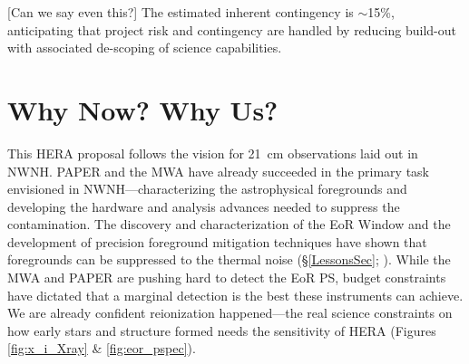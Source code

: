 \documentclass[preprint]{aastex}
\begin{document}
%

[Can we say even this?] The estimated inherent contingency is $\sim$15\%, anticipating that project 
risk and contingency are handled by reducing
build-out with associated de-scoping of science capabilities.


\section{Why Now? Why Us?} %

This HERA proposal follows the vision for 21~cm observations laid out in NWNH. PAPER and the MWA have already succeeded in the primary task envisioned in NWNH---characterizing the astrophysical foregrounds and developing the hardware and analysis advances needed to suppress the contamination. The discovery and characterization of the EoR Window and the development of precision foreground mitigation techniques have shown that foregrounds can be suppressed to the thermal noise (\S \ref{LessonsSec}; \citealt{parsons_et_al2013}). While the MWA and PAPER are pushing hard to detect the EoR PS, budget constraints have dictated that a marginal detection is the best these instruments can achieve. We are already confident reionization happened---the real science constraints on how early stars and structure formed needs the sensitivity of HERA (Figures \ref{fig:x_i_Xray} \& \ref{fig:eor_pspec}).
\end{document}
